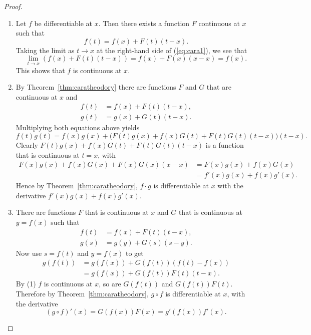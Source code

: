 \begin{proof}
  \begin{enumerate}[(1)]
    \item Let $f$ be differentiable at $x$.  Then there exists a function $F$ continuous at $x$ such that 
      \begin{equation}
	\label{eq:cara1}
	f(t) = f(x) + F(t) (t-x).
      \end{equation}
      Taking the limit as $t \to x$ at the right-hand side of (\ref{eq:cara1}), we see that
      \[
	\lim_{t \to x} (f(x) + F(t) (t-x)) = f(x) + F(x) (x-x) = f(x).
      \]
      This shows that $f$ is continuous at $x$.

      \addtocounter{enumi}{1}
    \item By Theorem~\ref{thm:caratheodory} there are functions $F$ and $G$ that are continuous at $x$ and
      \begin{align*}
	f(t) &= f(x) + F(t) (t-x), \\
	g(t) &= g(x) + G(t) (t-x).
      \end{align*}
      Multiplying both equations above yields
      \[
	f(t) g(t) = f(x) g(x) + \bigl(F(t)g(x) + f(x)G(t) + F(t)G(t)(t-x)\bigr) (t-x).
      \]
      Clearly $F(t) g(x) + f(x) G(t) + F(t) G(t) (t-x)$ is a function that is continuous at $t = x$, with
      \begin{align*}
	F(x) g(x) + f(x) G(x) + F(x) G(x) (x-x) &= F(x) g(x) + f(x) G(x) \\
	&= f'(x) g(x) + f(x) g'(x).
      \end{align*}
      Hence by Theorem~\ref{thm:caratheodory}, $f \cdot g$ is differentiable at $x$ with the derivative $f'(x) g(x) + f(x) g'(x)$. 

      \addtocounter{enumi}{2}
    \item There are functions $F$ that is continuous at $x$ and $G$ that is continuous at $y = f(x)$ such that
      \begin{align*}
	f(t) &= f(x) + F(t) (t-x), \\
	g(s) &= g(y) + G(s) (s-y).
      \end{align*}
      Now use $s = f(t)$ and $y = f(x)$ to get
      \begin{align*}
	g(f(t)) &= g(f(x)) + G(f(t)) (f(t) - f(x)) \\
	&= g(f(x)) + G(f(t)) F(t) (t-x).
      \end{align*}
      By (1) $f$ is continuous at $x$, so are $G(f(t))$ and $G(f(t)) F(t)$.
      Therefore by Theorem~\ref{thm:caratheodory}, $g \circ f$ is differentiable at $x$, with the derivative
      \[
	(g \circ f)'(x) = G(f(x)) F(x) = g'(f(x)) f'(x).
      \]
  \end{enumerate}
\end{proof}

